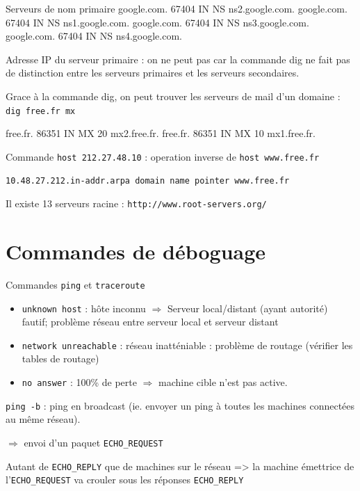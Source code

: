 \documentclass[11pt,english,french]{scrreprt}
\theoremstyle{remark}
\theoremstyle{definition}
\begin{document}
\begin{verbatimtab}
Serveurs de nom primaire
google.com.             67404   IN      NS      ns2.google.com.
google.com.             67404   IN      NS      ns1.google.com.
google.com.             67404   IN      NS      ns3.google.com.
google.com.             67404   IN      NS      ns4.google.com.
\end{verbatimtab}

Adresse IP du serveur primaire : on ne peut pas car la commande dig ne fait pas de distinction entre les serveurs primaires et les serveurs secondaires.

Grace à la commande dig, on peut trouver les serveurs de mail d'un domaine :
\lstinline!dig free.fr mx!

\begin{verbatimtab}
free.fr.                86351   IN      MX      20 mx2.free.fr.
free.fr.                86351   IN      MX      10 mx1.free.fr.
\end{verbatimtab}

Commande \lstinline!host 212.27.48.10! : operation inverse de \lstinline!host www.free.fr!

\lstinline!10.48.27.212.in-addr.arpa domain name pointer www.free.fr!

Il existe 13 serveurs racine : \lstinline!http://www.root-servers.org/!

\section{Commandes de déboguage} %

 
Commandes \lstinline!ping! et \lstinline!traceroute!

\begin{itemize}
	\item \lstinline!unknown host! : hôte inconnu $\Rightarrow$ Serveur local/distant (ayant autorité) fautif; problème réseau entre serveur local et serveur distant
	\item \lstinline!network unreachable! : réseau inatténiable : problème de routage (vérifier les tables de routage)
	\item \lstinline!no answer! : 100\% de perte $\Rightarrow$ machine cible n'est pas active.
\end{itemize}

\lstinline!ping -b! : ping en broadcast (ie. envoyer un ping à toutes les machines connectées au même réseau).

$\Rightarrow$ envoi d'un paquet \lstinline!ECHO_REQUEST!

Autant de \lstinline!ECHO_REPLY! que de machines sur le réseau => la machine émettrice de l'\lstinline!ECHO_REQUEST! va crouler sous les réponses \lstinline!ECHO_REPLY!
\end{document}
